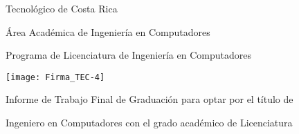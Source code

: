 
\thispagestyle{empty} 

\begin{center}

Tecnológico de Costa Rica

\par\vspace{1ex}

Área Académica de Ingeniería en Computadores

\par\vspace{1ex}

Programa de Licenciatura de Ingeniería en Computadores

\par\vspace{20mm}

\texttt{[image: Firma\_TEC-4]}

\par\vspace*{\fill}

{\large\bf{\thesisTitle}}

\par\vspace*{\fill}

Informe de Trabajo Final de Graduación para optar por el título de

Ingeniero en Computadores con el grado académico de Licenciatura

\par\vspace{20mm}

\thesisAuthor

\vspace*{\fill}

\end{center}
\newpage 
\cleardoublepage 


